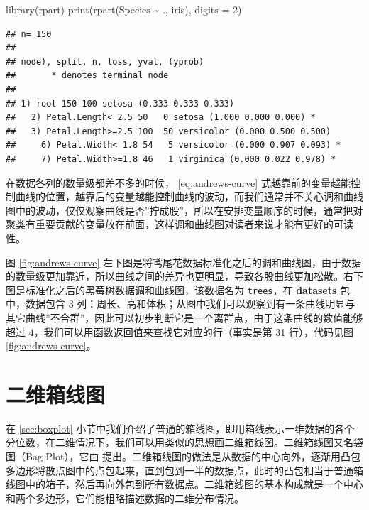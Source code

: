 \documentclass[
  b5paper,
  UTF8,twoside]{book}
\newenvironment{Shaded}{\begin{snugshade}}{\end{snugshade}}
\newcommand{\AttributeTok}[1]{\textcolor[rgb]{0.77,0.63,0.00}{#1}}
\newcommand{\DecValTok}[1]{\textcolor[rgb]{0.00,0.00,0.81}{#1}}
\newcommand{\FunctionTok}[1]{\textcolor[rgb]{0.00,0.00,0.00}{#1}}
\newcommand{\NormalTok}[1]{#1}
\newcommand{\SpecialCharTok}[1]{\textcolor[rgb]{0.00,0.00,0.00}{#1}}
\begin{document}
\begin{Shaded}
\begin{Highlighting}[]
\FunctionTok{library}\NormalTok{(rpart)}
\FunctionTok{print}\NormalTok{(}\FunctionTok{rpart}\NormalTok{(Species }\SpecialCharTok{\textasciitilde{}}\NormalTok{ ., iris), }\AttributeTok{digits =} \DecValTok{2}\NormalTok{)}
\end{Highlighting}
\end{Shaded}

\begin{verbatim}
## n= 150 
## 
## node), split, n, loss, yval, (yprob)
##       * denotes terminal node
## 
## 1) root 150 100 setosa (0.333 0.333 0.333)  
##   2) Petal.Length< 2.5 50   0 setosa (1.000 0.000 0.000) *
##   3) Petal.Length>=2.5 100  50 versicolor (0.000 0.500 0.500)  
##     6) Petal.Width< 1.8 54   5 versicolor (0.000 0.907 0.093) *
##     7) Petal.Width>=1.8 46   1 virginica (0.000 0.022 0.978) *
\end{verbatim}

在数据各列的数量级都差不多的时候， \eqref{eq:andrews-curve} 式越靠前的变量越能控制曲线的位置，越靠后的变量越能控制曲线的波动，而我们通常并不关心调和曲线图中的波动，仅仅观察曲线是否''拧成股''，所以在安排变量顺序的时候，通常把对聚类有重要贡献的变量放在前面，这样调和曲线图对读者来说才能有更好的可读性。

图 \ref{fig:andrews-curve}
左下图是将鸢尾花数据标准化之后的调和曲线图，由于数据的数量级更加靠近，所以曲线之间的差异也更明显，导致各股曲线更加松散。右下图是标准化之后的黑莓树数据调和曲线图，该数据名为 \texttt{trees}，在 \textbf{datasets} 包中，数据包含 3 列：周长、高和体积；从图中我们可以观察到有一条曲线明显与其它曲线''不合群''，因此可以初步判断它是一个离群点，由于这条曲线的数值能够超过 4，我们可以用函数返回值来查找它对应的行（事实是第 31 行），代码见图 \ref{fig:andrews-curve}。

\hypertarget{sec:bagplot}{%
\section{二维箱线图}\label{sec:bagplot}}

在 \ref{sec:boxplot} 小节中我们介绍了普通的箱线图，即用箱线表示一维数据的各个分位数，在二维情况下，我们可以用类似的思想画二维箱线图。二维箱线图又名袋图（Bag Plot），它由 \citet{Rousseeuw99} 提出。二维箱线图的做法是从数据的中心向外，逐渐用凸包多边形将散点图中的点包起来，直到包到一半的数据点，此时的凸包相当于普通箱线图中的箱子，然后再向外包到所有数据点。二维箱线图的基本构成就是一个中心和两个多边形，它们能粗略描述数据的二维分布情况。
\end{document}
